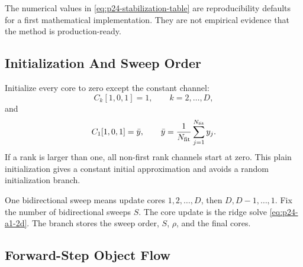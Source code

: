 \documentclass[11pt]{article}
\numberwithin{equation}{section}
\begin{document}
The numerical values in \eqref{eq:p24-stabilization-table} are reproducibility
defaults for a first mathematical implementation.  They are not empirical
evidence that the method is production-ready.

\subsection{Initialization And Sweep Order}

Initialize every core to zero except the constant channel:
\[
    C_k[1,0,1]=1,\qquad k=2,\ldots,D,
\]
and
\[
    C_1[1,0,1]=\bar y,\qquad
    \bar y=\frac1{N_{\rm fit}}\sum_{j=1}^{N_{\rm fit}}y_j.
\]
If a rank is larger than one, all non-first rank channels start at zero.  This
plain initialization gives a constant initial approximation and avoids a random
initialization branch.

One bidirectional sweep means update cores \(1,2,\ldots,D\), then
\(D,D-1,\ldots,1\).  Fix the number of bidirectional sweeps \(S\).  The core
update is the ridge solve \eqref{eq:p24-a1-2d}.  The branch stores the sweep order, \(S\),
\(\rho\), and the final cores.

\subsection{Forward-Step Object Flow}
\end{document}
